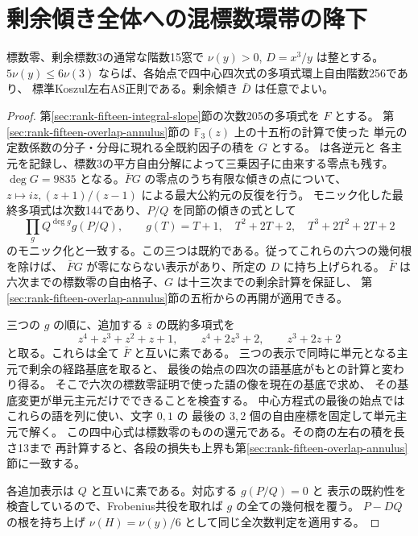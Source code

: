 \section{剰余傾き全体への混標数環帯の降下}
\label{sec:rank-fifteen-integral-annulus}
\begin{theorem}\label{thm:rank-fifteen-integral-annulus}
標数零、剰余標数3の通常な階数15窓で $\nu(y)>0$, $D=x^3/y$ は整とする。
$5\nu(y)\le6\nu(3)$ ならば、各始点で四中心四次式の多項式環上自由階数256であり、
標準Koszul左右AS正則である。剰余傾き $\bar D$ は任意でよい。
\end{theorem}
\begin{proof}
第\ref{sec:rank-fifteen-integral-slope}節の次数205の多項式を $F$ とする。
第\ref{sec:rank-fifteen-overlap-annulus}節の $\mathbb F_3(z)$ 上の十五桁の計算で使った
単元の定数係数の分子・分母に現れる全既約因子の積を $G$ とする。
 は各逆元と
各主元を記録し、標数3の平方自由分解によって三乗因子に由来する零点も残す。
$\deg G=9835$ となる。$\bar F G$ の零点のうち有限な傾きの点について、
$z\mapsto iz,(z+1)/(z-1)$ による最大公約元の反復を行う。
モニック化した最終多項式は次数144であり、$P/Q$ を同節の傾きの式として
\[
 \prod_g Q^{\deg g}g(P/Q),\qquad
 g(T)=T+1,\quad T^2+2T+2,\quad T^3+2T^2+2T+2
\]
のモニック化と一致する。この三つは既約である。従ってこれらの六つの幾何根を除けば、
$\bar F G$ が零にならない表示があり、所定の $D$ に持ち上げられる。
$\bar F$ は六次までの標数零の自由格子、$G$ は十三次までの剰余計算を保証し、
第\ref{sec:rank-fifteen-overlap-annulus}節の五桁からの再開が適用できる。

三つの $g$ の順に、追加する $\bar z$ の既約多項式を
\[
 z^4+z^3+z^2+z+1,\qquad z^4+2z^3+2,\qquad z^3+2z+2
\]
と取る。これらは全て $\bar F$ と互いに素である。
三つの表示で同時に単元となる主元で剰余の経路基底を取ると、
最後の始点の四次の語基底がもとの計算と変わり得る。
そこで六次の標数零証明で使った語の像を現在の基底で求め、
その基底変更が単元主元だけでできることを検査する。
中心方程式の最後の始点ではこれらの語を列に使い、文字 $0,1$ の
最後の $3,2$ 個の自由座標を固定して単元主元で解く。
この四中心式は標数零のものの還元である。その商の左右の積を長さ13まで
再計算すると、各段の損失も上界も第\ref{sec:rank-fifteen-overlap-annulus}節に一致する。

各追加表示は $Q$ と互いに素である。対応する $g(P/Q)=0$ と
表示の既約性を検査しているので、Frobenius共役を取れば $g$ の全ての幾何根を覆う。
$P-DQ$ の根を持ち上げ $\nu(H)=\nu(y)/6$ として同じ全次数判定を適用する。
\end{proof}

